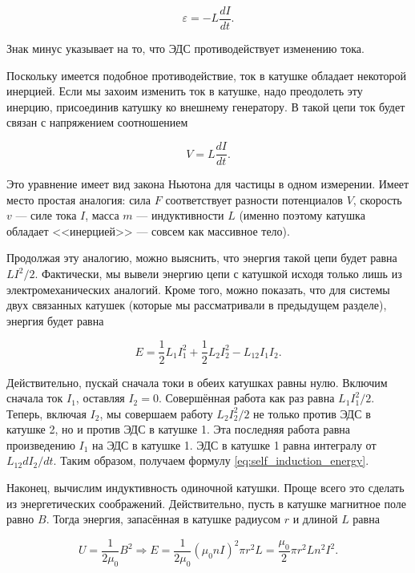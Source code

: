 \documentclass[11pt,a4paper]{article}
\numberwithin{equation}{section}
\newcommand{\vareps}{\varepsilon}
\begin{document}
\begin{equation}
  \label{eq:self_induction_3}
  \vareps = - L \frac{dI}{dt}. 
\end{equation}

Знак минус указывает на то, что ЭДС противодействует изменению тока. 

Поскольку имеется подобное противодействие, ток в катушке обладает
некоторой инерцией. Если мы захоим изменить ток в катушке, надо
преодолеть эту инерцию, присоединив катушку ко внешнему генератору. В
такой цепи ток будет связан с напряжением соотношением

\begin{equation}
  \label{eq:self_induction_4}
  V = L \frac{dI}{dt}.
\end{equation}

Это уравнение имеет вид закона Ньютона для частицы в одном
измерении. Имеет место простая аналогия: сила $F$ соответствует
разности потенциалов $V$, скорость $v$ --- силе тока $I$, масса $m$
--- индуктивности $L$ (именно поэтому катушка обладает <<инерцией>>
--- совсем как массивное тело). 

Продолжая эту аналогию, можно выяснить, что энергия такой цепи будет
равна $LI^2/2$. Фактически, мы вывели энергию цепи с катушкой исходя
только лишь из электромеханических аналогий. Кроме того, можно
показать, что для системы двух связанных катушек (которые мы
рассматривали в предыдущем разделе), энергия будет равна

\begin{equation}
  \label{eq:self_induction_energy}
  E = \frac12 L_1 I_1^2 + \frac12 L_2 I_2^2 - L_{12} I_1 I_2.
\end{equation}

Действительно, пускай сначала токи в обеих катушках равны
нулю. Включим сначала ток $I_1$, оставляя $I_2=0$. Совершённая работа
как раз равна $L_1 I_1^2/2$. Теперь, включая $I_2$, мы совершаем
работу $L_2 I_2^2/2$ не только против ЭДС в катушке 2, но и против ЭДС
в катушке 1. Эта последняя работа равна произведению $I_1$ на ЭДС в
катушке 1. ЭДС в катушке 1 равна интегралу от $L_{12} dI_2/dt$. Таким
образом, получаем формулу \eqref{eq:self_induction_energy}. 


Наконец, вычислим индуктивность одиночной катушки. Проще всего это
сделать из энергетических соображений. Действительно, пусть в катушке
магнитное поле равно $B$. Тогда энергия, запасённая в катушке радиусом
$r$ и длиной $L$ равна

\begin{equation}
  \label{eq:coil_energy_1}
  U = \frac{1}{2 \mu_0} B^2 \Rightarrow E = \frac{1}{2\mu_0} (\mu_0 n
  I)^2 \pi r^2 L = \frac{\mu_0}{2} \pi r^2 L n^2 I^2.
\end{equation}
\end{document}
